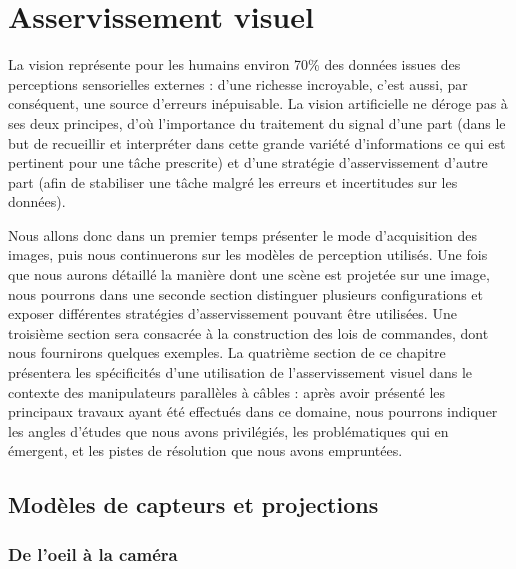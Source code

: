 \chapter{Asservissement visuel} \label{chap1}

La vision représente pour les humains environ 70\% des données issues des 
perceptions sensorielles externes \cite{purves2004neuroscience} : d'une 
richesse incroyable, c'est aussi, par conséquent, une source d'erreurs 
inépuisable. La vision artificielle ne déroge pas à ses deux principes, d'où 
l'importance du traitement du signal d'une part (dans le but de recueillir et 
interpréter dans cette grande variété d'informations ce qui est pertinent pour 
une tâche prescrite) et d'une stratégie d'asservissement d'autre part (afin de 
stabiliser une tâche malgré les erreurs et incertitudes sur les données).

Nous allons donc dans un premier temps présenter le mode d'acquisition des 
images, puis nous continuerons sur les modèles de perception utilisés. Une fois 
que nous aurons détaillé la manière dont une scène est projetée sur une image, 
nous pourrons dans une seconde section distinguer plusieurs configurations et 
exposer différentes stratégies d'asservissement pouvant être utilisées. Une 
troisi\`eme section sera consacr\'ee \`a la construction des lois de 
commandes, dont nous fournirons quelques exemples. La quatri\`eme section de ce 
chapitre pr\'esentera les sp\'ecificit\'es d'une utilisation de 
l'asservissement visuel dans le contexte des manipulateurs parall\`eles \`a 
c\^ables : apr\`es avoir pr\'esent\'e les principaux travaux ayant \'et\'e 
effectu\'es dans ce domaine, nous pourrons indiquer les angles d'\'etudes que 
nous avons privil\'egi\'es, les probl\'ematiques qui en \'emergent, et les 
pistes de r\'esolution que nous avons emprunt\'ees.
 
\section{Modèles de capteurs et projections} \label{chap1-0}
 
\subsection{De l'oeil à la caméra} \label{chap1-0-0}
 
